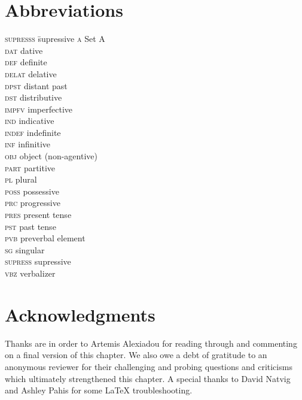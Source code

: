 \documentclass[output=paper,colorlinks,citecolor=brown,footheight=42pt]{langscibook}
\begin{document}
\section*{Abbreviations}\largerpage
\begin{multicols}{2}
\begin{tabbing}
\textsc{supresss} \=  supressive  \kill
\textsc{a} \>        Set A  \\
\textsc{dat} \>      dative  \\
\textsc{def} \>      definite  \\
\textsc{delat} \>    delative  \\
\textsc{dpst} \>     distant past  \\
\textsc{dst} \>      distributive  \\
\textsc{impfv} \>    imperfective  \\
\textsc{ind} \>      indicative  \\
\textsc{indef} \>    indefinite  \\
\textsc{inf} \>      infinitive  \\
\textsc{obj} \>      object (non-agentive)  \\
\textsc{part} \>     partitive  \\
\textsc{pl} \>       plural  \\
\textsc{poss} \>     possessive  \\
\textsc{prc} \>      progressive  \\
\textsc{pres} \>     present tense  \\
\textsc{pst} \>      past tense  \\
\textsc{pvb} \>      preverbal element  \\
\textsc{sg} \>       singular  \\
\textsc{supress} \>  supressive  \\
\textsc{vbz} \>      verbalizer  \\
\end{tabbing}
\end{multicols}

\section*{Acknowledgments}
Thanks are in order to Artemis Alexiadou for reading through and commenting on a final version of this chapter. We also owe a debt of gratitude to an anonymous reviewer for their challenging and probing questions and criticisms which ultimately strengthened this chapter. A special thanks to David Natvig and Ashley Pahis for some \LaTeX{} troubleshooting. 

\printbibliography[heading=subbibliography,notkeyword=this]
\end{document}
